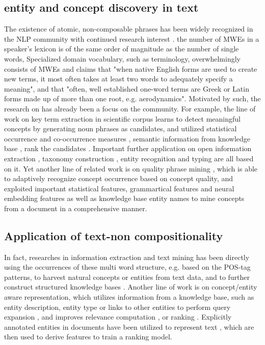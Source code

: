 \subsection{entity and concept discovery in text}
The existence of atomic, non-composable phrases has been widely recognized in the NLP community with continued research interest \cite{sag2002multiword, baldwin2010multiword, constant2017multiword, hashimoto2016adaptive}. \cite{jackendoff1997architecture}
the number of MWEs in a speaker's lexicon is of the same order of magnitude as the number of single words,
Specialized domain vocabulary, such as terminology, overwhelmingly consists of MWEs
and \cite{justeson1995technical} claims that 
"when native English forms are used to create new terms, it most often takes at least two words to adequately specify a meaning", and that "often, well established one-word terms are Greek or Latin forms made up of more than one root, e.g. aerodynamics".
Motivated by such, the research on has already been a focus on the community. For example, the  line of work on key term extraction in scientific corpus \cite{beliga2015overview, zhang2008comparative} learns to detect meaningful concepts by  generating noun phrases as candidates, and utilized statistical occurrence and co-occurrence measures \cite{frantzi2000automatic}, semantic information from knowledge base \cite{medelyan2006thesaurus}, rank the candidates \cite{nguyen2007keyphrase}. Important further application on open information extraction \cite{banko2007open}, taxonomy construction \cite{wu2012probase, carlson2010toward}, entity recognition and typing \cite{ren2016automatic, facetgist} are all based on it.
Yet another line of related work is on quality phrase mining \cite{segphrase, autophrase, li2018concept}, which is able to adaptively recognize concept occurrence based on concept quality, and exploited important statistical features, grammartical features and neural embedding features \cite{autophrase} as well as knowledge base entity names to mine concepts from a document in a comprehensive manner.



\subsection{Application of text-non compositionality}
In fact, researches in information extraction and text mining has been directly using the occurrences of these multi word structure, e.g. based on the POS-tag patterns, to harvest natural concepts or entities from text data, and to further construct structured knowledge bases \cite{banko2007open, wu2012probase, ren2016automatic}. 
Another line of work is on concept/entity aware representation, which utilizes information from a knowledge base, such as entity description, entity type or links to other entities to perform query expansion \cite{xiong2015query, dalton2014entity}, 
and improves relevance computation \cite{shen2018entity}, or ranking \cite{xiong2015esdrank}.
Explicitly annotated entities in documents have been utilized to represent text \cite{xiong2017explicit, xiong2017word}, which are then used to derive features to train a ranking model. 
